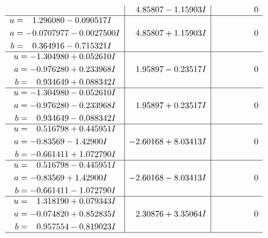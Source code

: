 \documentclass[1p]{elsarticle_modified}
\theoremstyle{definition}
\begin{document}
$$\begin{array}{c|c|c}
 & \phantom{-}4.85807 - 1.15903 I & \phantom{-0.000000 } 0 \\ \hline\begin{aligned}
u &= \phantom{-}1.296080 - 0.090517 I \\
a &= -0.0707977 - 0.0027500 I \\
b &= \phantom{-}0.364916 - 0.715321 I\end{aligned}
 & \phantom{-}4.85807 + 1.15903 I & \phantom{-0.000000 } 0 \\ \hline\begin{aligned}
u &= -1.304980 + 0.052610 I \\
a &= -0.976280 + 0.233968 I \\
b &= \phantom{-}0.934649 + 0.088342 I\end{aligned}
 & \phantom{-}1.95897 - 0.23517 I & \phantom{-0.000000 } 0 \\ \hline\begin{aligned}
u &= -1.304980 - 0.052610 I \\
a &= -0.976280 - 0.233968 I \\
b &= \phantom{-}0.934649 - 0.088342 I\end{aligned}
 & \phantom{-}1.95897 + 0.23517 I & \phantom{-0.000000 } 0 \\ \hline\begin{aligned}
u &= \phantom{-}0.516798 + 0.445951 I \\
a &= -0.83569 - 1.42900 I \\
b &= -0.661411 + 1.072790 I\end{aligned}
 & -2.60168 + 8.03413 I & \phantom{-0.000000 } 0 \\ \hline\begin{aligned}
u &= \phantom{-}0.516798 - 0.445951 I \\
a &= -0.83569 + 1.42900 I \\
b &= -0.661411 - 1.072790 I\end{aligned}
 & -2.60168 - 8.03413 I & \phantom{-0.000000 } 0 \\ \hline\begin{aligned}
u &= \phantom{-}1.318190 + 0.079343 I \\
a &= -0.074820 + 0.852835 I \\
b &= \phantom{-}0.957554 - 0.819023 I\end{aligned}
 & \phantom{-}2.30876 + 3.35064 I & \phantom{-0.000000 } 0\\
 \hline 
 \end{array}$$\newpage$$\begin{array}{c|c|c}  

\end{array}$$
\end{document}
